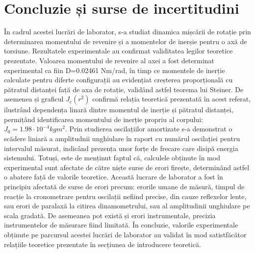 \documentclass[a4paper,12pt]{article}
\begin{document}
\section{Concluzie și surse de incertitudini}
În cadrul acestei lucrări de laborator, s-a studiat dinamica mișcării de rotație prin determinarea momentului de revenire și a momentelor de inerșie pentru o axă de torsiune. \newline
\indent Rezultatele experimentale au confirmat validitatea legilor teoretice prezentate. Valoarea momentului de revenire al axei a fost determinat experimental ca fiin D=0.02461 Nm/rad, în timp ce momentele de inerție calculate pentru diferte configurații au evidențiat creșterea proporțională cu pătratul distanței față de axa de rotație, validând astfel teorema lui Steiner. De asemenea și graficul $J_c(r^2)$ confirmă relația teoretică prezentată în acest referat, ilustrând dependența linară dintre momentul de inerție și pătratul distanței, permițând identificarea momentului de inerție propriu al corpului: $J_0=1.98 \cdot 10^{-4}kgm^2$. Prin studierea oscilațiilor amortizate s-a demonstrat o scădere liniară a amplitudnii unghiulare în raport cu numărul oscilației pentru intervalul măsurat, indicând prezența unor forțe de frecare care disipă energia sistemului. \newline
\indent Totuși, este de menținut faptul că, calculele obținute în mod experimental sunt afectate de către niște surse de erori firește, determinând astfel o abatere față de valorile teoretice. Această lucrare de laborator a fost în principiu afectată de surse de erori precum: erorile umane de măsură, timpul de reacție la cronometrare pentru oscilații nefiind precise, din cauze reflexelor lente, sau erori de paralaxă la citirea dinamometrului, sau al amplitudinii unghiulare pe scala gradată. De asemeanea pot există și erori instrumentale, precizia instrumentelor de măsurare fiind limitată.
\newline
\indent În concluzie, valorile experimentale obținute pe parcursul acestei lucrări de laborator au validat în mod satistfăcător relațiile teoretice prezentate în secțiunea de introducere teoretică. 
\end{document}
